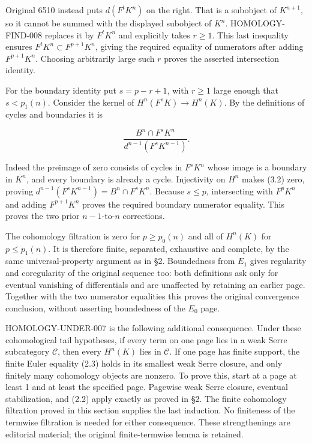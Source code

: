 Original 6510 instead puts \(d(F^tK^n)\) on the right. That is a subobject of \(K^{n+1}\), so it cannot be summed with the displayed subobject of \(K^n\). HOMOLOGY-FIND-008 replaces it by \(F^tK^n\) and explicitly takes \(r\geq1\). This last inequality ensures \(F^tK^n\subset F^{p+1}K^n\), giving the required equality of numerators after adding \(F^{p+1}K^n\). Choosing arbitrarily large such \(r\) proves the asserted intersection identity.

For the boundary identity put \(s=p-r+1\), with \(r\geq1\) large enough that \(s<p_1(n)\). Consider the kernel of \(H^n(F^sK)\to H^n(K)\). By the definitions of cycles and boundaries it is

\[
\frac{B^n\cap F^sK^n}{d^{n-1}(F^sK^{n-1})}.       \tag{3.2}
\]

Indeed the preimage of zero consists of cycles in \(F^sK^n\) whose image is a boundary in \(K^n\), and every boundary is already a cycle. Injectivity on \(H^n\) makes (3.2) zero, proving \(d^{n-1}(F^sK^{n-1})=B^n\cap F^sK^n\). Because \(s\leq p\), intersecting with \(F^pK^n\) and adding \(F^{p+1}K^n\) proves the required boundary numerator equality. This proves the two prior \(n-1\)-to-\(n\) corrections.

The cohomology filtration is zero for \(p\geq p_0(n)\) and all of \(H^n(K)\) for \(p\leq p_1(n)\). It is therefore finite, separated, exhaustive and complete, by the same universal-property argument as in §2. Boundedness from \(E_1\) gives regularity and coregularity of the original sequence too: both definitions ask only for eventual vanishing of differentials and are unaffected by retaining an earlier page. Together with the two numerator equalities this proves the original convergence conclusion, without asserting boundedness of the \(E_0\) page.

HOMOLOGY-UNDER-007 is the following additional consequence. Under these cohomological tail hypotheses, if every term on one page lies in a weak Serre subcategory \(\mathcal C\), then every \(H^n(K)\) lies in \(\mathcal C\). If one page has finite support, the finite Euler equality (2.3) holds in its smallest weak Serre closure, and only finitely many cohomology objects are nonzero. To prove this, start at a page at least 1 and at least the specified page. Pagewise weak Serre closure, eventual stabilization, and (2.2) apply exactly as proved in §2. The finite cohomology filtration proved in this section supplies the last induction. No finiteness of the termwise filtration is needed for either consequence. These strengthenings are editorial material; the original finite-termwise lemma is retained.

